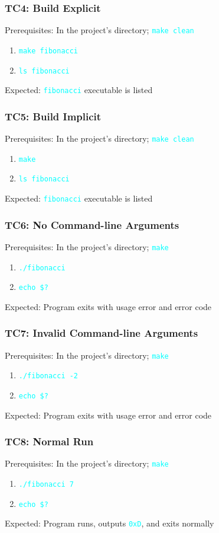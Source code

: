 \documentclass{article}
\newcommand{\code}[1]{\textcolor{cyan}{\texttt{#1}}}
\begin{document}
\subsubsection{TC4: Build Explicit}
Prerequisites: In the project's directory; \code{make clean}
\begin{enumerate}
	\item \code{make fibonacci}
	\item \code{ls fibonacci}
\end{enumerate}
Expected: \code{fibonacci} executable is listed


\subsubsection{TC5: Build Implicit}
Prerequisites: In the project's directory; \code{make clean}
\begin{enumerate}
	\item \code{make}
	\item \code{ls fibonacci}
\end{enumerate}
Expected: \code{fibonacci} executable is listed


\subsubsection{TC6: No Command-line Arguments}
Prerequisites: In the project's directory; \code{make}
\begin{enumerate}
	\item \code{./fibonacci}
	\item \code{echo \$?}
\end{enumerate}
Expected: Program exits with usage error and error code


\subsubsection{TC7: Invalid Command-line Arguments}
Prerequisites: In the project's directory; \code{make}
\begin{enumerate}
	\item \code{./fibonacci -2}
	\item \code{echo \$?}
\end{enumerate}
Expected: Program exits with usage error and error code


\subsubsection{TC8: Normal Run}
Prerequisites: In the project's directory; \code{make}
\begin{enumerate}
	\item \code{./fibonacci 7}
	\item \code{echo \$?}
\end{enumerate}
Expected: Program runs, outputs \code{0xD}, and exits normally
\end{document}
